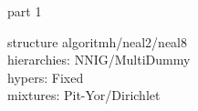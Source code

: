 

\begin{frame}{part 1}

structure algoritmh/neal2/neal8 \\
hierarchies: NNIG/MultiDummy \\
hypers: Fixed \\
mixtures: Pit-Yor/Dirichlet
\end{frame}
